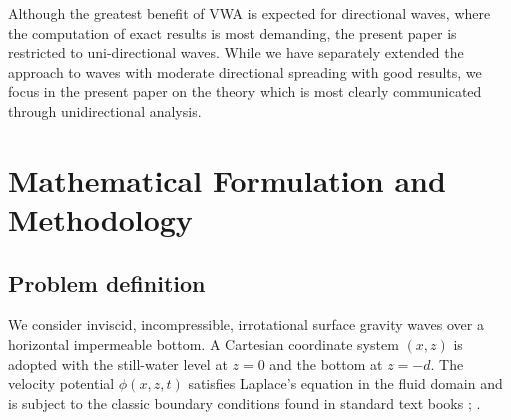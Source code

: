 \documentclass[lineno]{JFM-FLM_Au}
\begin{document}
Although the greatest benefit of VWA is expected for directional waves, where the computation of exact results is most demanding, the present paper is restricted to uni-directional waves. While we have separately extended the approach to waves with moderate directional spreading with good results, we focus in the present paper on the theory which is most clearly communicated through unidirectional analysis.


\section{Mathematical Formulation and Methodology}
\subsection{Problem definition}
\label{sec:problemdefinition}

 We consider inviscid, incompressible, irrotational surface gravity waves over a horizontal impermeable bottom. A Cartesian coordinate system $(x,z)$ is adopted with the still-water level at $z=0$ and the bottom at $z=-d$. The velocity potential $\phi(x,z,t)$ satisfies Laplace's equation in the fluid domain and is subject to the classic boundary conditions found in standard text books \citep[Sec.~1.1]{meiTheoryApplicationsOcean2017};
\citep[Sec.~2.1]{dingemansWaterWavePropagation1997}.

\end{document}
